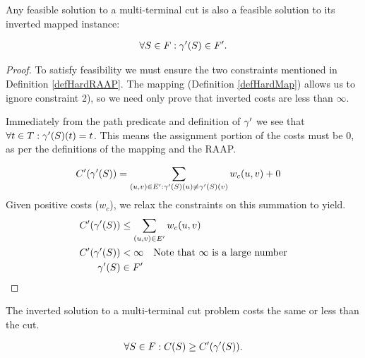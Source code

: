 \begin{lemma}
\label{INVERSEFEASIBLE}
Any feasible solution to a multi-terminal cut is also a feasible solution to its inverted mapped instance:

\begin{align}
	\nonumber \forall S \in F : \gamma'(S) \in F'.
\end{align}
\end{lemma}

\begin{proof}
To satisfy feasibility we must ensure the two constraints mentioned in Definition \ref{defHardRAAP}.
The mapping (Definition \ref{defHardMap}) allows us to ignore constraint 2), so we need only prove that inverted costs are less than $\infty$.

Immediately from the path predicate and definition of $\gamma'$ we see that $\forall t \in T : \gamma'(S)(t) = t$.
This means the assignment portion of the costs must be 0, as per the definitions of the mapping and the RAAP.

\begin{align}
	\nonumber C'(\gamma'(S)) & = \displaystyle\sum\limits_{(u,v) \in E' : \gamma'(S)(u) \neq \gamma'(S)(v)} w_c(u,v) + 0
\end{align}
\noindent Given positive costs ($w_c$), we relax the constraints on this summation to yield.
\begin{align}
	\nonumber C'(\gamma'(S)) & \leq \displaystyle\sum\limits_{(u,v) \in E'} w_c(u,v) \\
	\nonumber C'(\gamma'(S)) & < \infty \quad \mbox{Note that $\infty$ is a large number}\\
	\nonumber \gamma'(S) & \in F'
\end{align}
\end{proof}

\begin{lemma}
\label{INVERSECOST}
The inverted solution to a multi-terminal cut problem costs the same or less than the cut.

\begin{align}
	\nonumber \forall S \in F : C(S) \geq C'(\gamma'(S)).
\end{align}
\end{lemma}

